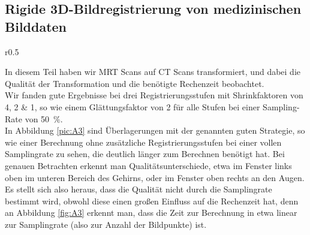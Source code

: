 \subsection{Rigide 3D-Bildregistrierung von medizinischen Bilddaten}
\begin{wrapfigure}{r}{0.5\linewidth}
  \vspace{-6pt}
  \vspace{-10pt}
  \caption{Die Berechnungsdauer steigt quasi linear mit der Samplingrate des Algorithmus}
  \label{fig:A3}
  \vspace{-10pt}
  \resizebox{\linewidth}{!}{}
  \vspace{-30pt}
\end{wrapfigure}
In diesem Teil haben wir MRT Scans auf CT Scans transformiert, und dabei die
Qualität der Transformation und die benötigte Rechenzeit beobachtet.\\
Wir fanden gute Ergebnisse bei drei Registrierungsstufen mit Shrinkfaktoren von
\num{4}, \num{2} \& \num{1}, so wie einem Glättungsfaktor von \num{2} für alle
Stufen bei einer Sampling-Rate von \SI{50}{\percent}.\\
In Abbildung \ref{pic:A3} sind Überlagerungen mit der genannten guten Strategie,
so wie einer Berechnung ohne zusätzliche Registrierungsstufen bei einer vollen
Samplingrate zu sehen, die deutlich länger zum Berechnen benötigt hat. Bei
genauen Betrachten erkennt man Qualitätsunterschiede, etwa im Fenster links
oben im unteren Bereich des Gehirns, oder im Fenster oben rechts an den Augen.
Es stellt sich also heraus, dass die Qualität nicht durch die Samplingrate
bestimmt wird, obwohl diese einen großen Einfluss auf die Rechenzeit hat, denn
an Abbildung \ref{fig:A3} erkennt man, dass die Zeit zur Berechnung in etwa
linear zur Samplingrate (also zur Anzahl der Bildpunkte) ist.
\newpage

